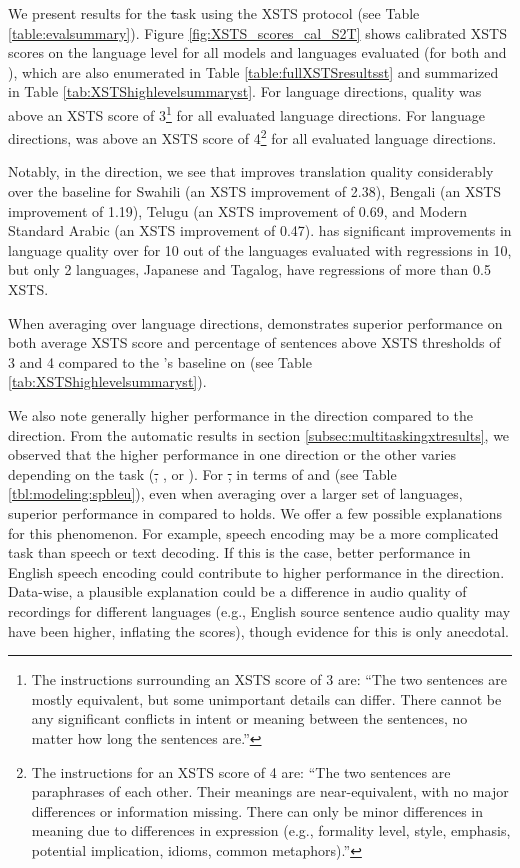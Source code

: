 We present results for the \st task using the XSTS protocol (see Table \ref{table:evalsummary}). Figure \ref{fig:XSTS_scores_cal_S2T} shows calibrated XSTS scores on the language level for all models and languages evaluated (for both \xeng and \engx), which are also enumerated in Table \ref{table:fullXSTSresultsst} and summarized in Table \ref{tab:XSTShighlevelsummaryst}. For \xeng language directions, \mfourtlg quality was above an XSTS score of 3\footnote{The instructions surrounding an XSTS score of 3 are: ``The two sentences are mostly equivalent, but some unimportant details can differ.  There cannot be any significant conflicts in intent or meaning between the sentences, no matter how long the sentences are.''} for all \evallangs{} evaluated language directions. For \engx language directions, \mfourtlg was above an XSTS score of 4\footnote{The instructions for an XSTS score of 4 are: ``The two sentences are paraphrases of each other. Their meanings are near-equivalent,  with no major differences or information missing. There can only be minor differences in meaning due to differences in expression (e.g., formality level, style, emphasis, potential implication, idioms, common metaphors).''} for all \evallangs{} evaluated language directions.

Notably, in the \xeng direction, we see that \mfourtlg improves translation quality considerably over the \whisperlarge baseline for Swahili (an XSTS improvement of 2.38), Bengali (an XSTS improvement of 1.19), Telugu (an XSTS improvement of 0.69, and Modern Standard Arabic (an XSTS improvement of 0.47). \mfourtlg has significant improvements in language quality over \whisperlarge for 10 out of the \evallangs{} languages evaluated \xeng with regressions in 10, but only 2 languages, Japanese and Tagalog, have regressions of more than 0.5 XSTS.

When averaging over language directions, \mfourtlg demonstrates superior performance on both average XSTS score and percentage of sentences above XSTS thresholds of 3 and 4 compared to the \whisperlarge's baseline on \xeng (see Table \ref{tab:XSTShighlevelsummaryst}).

We also note generally higher performance in the \engx direction compared to the \xeng direction. From the automatic results in section \ref{subsec:multitaskingxtresults}, we observed that the higher performance in one direction or the other varies depending on the task (\st, \sst, or \mt). For \st, in terms of \spbleu and \blaser (see Table \ref{tbl:modeling:spbleu}), even when averaging over a larger set of languages, superior performance in \engx compared to \xeng holds. We offer a few possible explanations for this phenomenon. For example, speech encoding may be a more complicated task than speech or text decoding. If this is the case, better performance in English speech encoding could contribute to higher performance in the \engx direction. Data-wise, a plausible explanation could be a difference in audio quality of \fleurs recordings for different languages (e.g., English source sentence audio quality may have been higher, inflating the \engx scores), though evidence for this is only anecdotal. %

